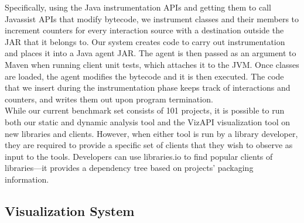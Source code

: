 Specifically, using the Java instrumentation APIs and getting them to call Javassist APIs that modify bytecode,
we instrument classes and their members to increment counters for every interaction source
with a destination outside the JAR that it belongs to.
Our system creates code to carry out instrumentation and places it into a Java agent JAR.
The agent is then passed as an argument to Maven when running client unit tests, which attaches it to the JVM.
Once classes are loaded, the agent modifies the bytecode and it is then executed.
The code that we insert during the instrumentation phase keeps track of interactions and counters,
and writes them out upon program termination. \\


While our current benchmark set consists of 101 projects, it is possible to run both our static and dynamic analysis tool and the VizAPI visualization tool on new libraries and clients. However, when either tool is run by a library developer, they are required to provide a specific set of clients that they wish to observe as input to the tools. Developers can use libraries.io to find popular clients of libraries---it provides a dependency tree based on projects' packaging information.


\subsection{Visualization System}
\label{subsec:vis-system}

